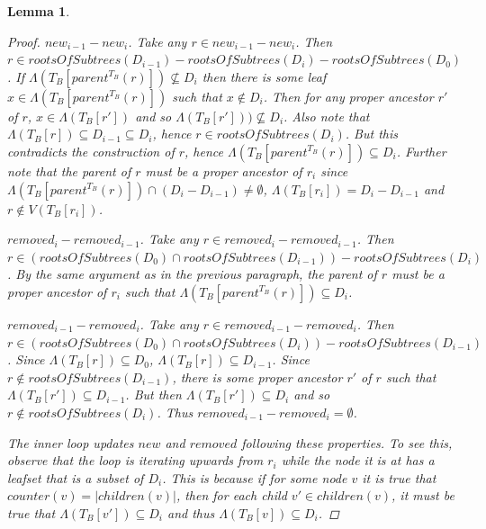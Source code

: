\documentclass{article}
\newcommand{\leafset}{\Lambda}
\newtheorem{computerootsofsubtreescorrectness}[incompatibility]{Lemma}
\begin{document}
\begin{computerootsofsubtreescorrectness}
\begin{proof}
            \textit{$new_{i-1} - new_i$.} Take any $r \in new_{i-1} - new_i$. Then $r \in rootsOfSubtrees(D_{i-1}) - rootsOfSubtrees(D_i) - rootsOfSubtrees(D_0)$. If $\leafset(T_B[parent^{T_B}(r)]) \not\subseteq D_i$ then there is some leaf $x \in \leafset(T_B[parent^{T_B}(r)])$ such that $x \not\in D_i$. Then for any proper ancestor $r'$ of $r$, $x \in \leafset(T_B[r'])$ and so $\leafset(T_B[r'])) \not\subseteq D_i$. Also note that $\leafset(T_B[r]) \subseteq D_{i-1} \subseteq D_i$, hence $r \in rootsOfSubtrees(D_i)$. But this contradicts the construction of $r$, hence $\leafset(T_B[parent^{T_B}(r)]) \subseteq D_i$. Further note that the parent of $r$ must be a proper ancestor of $r_i$ since $\leafset(T_B[parent^{T_B}(r)]) \cap (D_i - D_{i-1}) \neq \emptyset$, $\leafset(T_B[r_i]) = D_i - D_{i-1}$ and $r \not\in V(T_B[r_i])$.

            \textit{$removed_i - removed_{i-1}$.} Take any $r \in removed_i - removed_{i-1}$. Then $r \in (rootsOfSubtrees(D_0) \cap rootsOfSubtrees(D_{i-1})) - rootsOfSubtrees(D_i)$. By the same argument as in the previous paragraph, the parent of $r$ must be a proper ancestor of $r_i$ such that $\leafset(T_B[parent^{T_B}(r)]) \subseteq D_i$.

            \textit{$removed_{i-1} - removed_i$.} Take any $r \in removed_{i-1} - removed_i$. Then $r \in (rootsOfSubtrees(D_0) \cap rootsOfSubtrees(D_i)) - rootsOfSubtrees(D_{i-1})$. Since $\leafset(T_B[r]) \subseteq D_0$, $\leafset(T_B[r]) \subseteq D_{i-1}$. Since $r \not\in rootsOfSubtrees(D_{i-1})$, there is some proper ancestor $r'$ of $r$ such that $\leafset(T_B[r']) \subseteq D_{i-1}$. But then $\leafset(T_B[r']) \subseteq D_i$ and so $r \not\in rootsOfSubtrees(D_i)$. Thus $removed_{i-1} - removed_i = \emptyset$.

            The inner loop updates $new$ and $removed$ following these properties. To see this, observe that the loop is iterating upwards from $r_i$ while the node it is at has a leafset that is a subset of $D_i$. This is because if for some node $v$ it is true that $counter(v) = |children(v)|$, then for each child $v' \in children(v)$, it must be true that $\leafset(T_B[v']) \subseteq D_i$ and thus $\leafset(T_B[v]) \subseteq D_i$.


\end{proof}
\end{computerootsofsubtreescorrectness}
\end{document}
